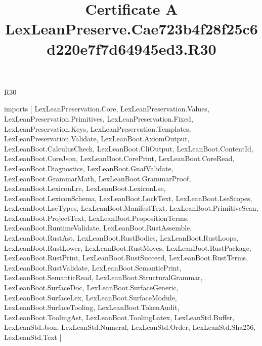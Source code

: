 \begin{lexlean}{R30}
\title{Certificate A LexLeanPreserve.Cae723b4f28f25c6d220e7f7d64945ed3.R30}
\begin{coremodule}
imports [
  LexLeanPreservation.Core,
  LexLeanPreservation.Values,
  LexLeanPreservation.Primitives,
  LexLeanPreservation.Fixed,
  LexLeanPreservation.Keys,
  LexLeanPreservation.Templates,
  LexLeanPreservation.Validate,
  LexLeanBoot.AxiomOutput,
  LexLeanBoot.CalculusCheck,
  LexLeanBoot.CliOutput,
  LexLeanBoot.ContentId,
  LexLeanBoot.CoreJson,
  LexLeanBoot.CorePrint,
  LexLeanBoot.CoreRead,
  LexLeanBoot.Diagnostics,
  LexLeanBoot.GnafValidate,
  LexLeanBoot.GrammarMath,
  LexLeanBoot.GrammarProof,
  LexLeanBoot.LexiconLre,
  LexLeanBoot.LexiconLse,
  LexLeanBoot.LexiconSchema,
  LexLeanBoot.LockText,
  LexLeanBoot.LseScopes,
  LexLeanBoot.LseTypes,
  LexLeanBoot.ManifestText,
  LexLeanBoot.PrimitiveScan,
  LexLeanBoot.ProjectText,
  LexLeanBoot.PropositionTerms,
  LexLeanBoot.RuntimeValidate,
  LexLeanBoot.RustAssemble,
  LexLeanBoot.RustAst,
  LexLeanBoot.RustBodies,
  LexLeanBoot.RustLoops,
  LexLeanBoot.RustLower,
  LexLeanBoot.RustMoves,
  LexLeanBoot.RustPackage,
  LexLeanBoot.RustPrint,
  LexLeanBoot.RustSucceed,
  LexLeanBoot.RustTerms,
  LexLeanBoot.RustValidate,
  LexLeanBoot.SemanticPrint,
  LexLeanBoot.SemanticRead,
  LexLeanBoot.StructuralGrammar,
  LexLeanBoot.SurfaceDoc,
  LexLeanBoot.SurfaceGeneric,
  LexLeanBoot.SurfaceLex,
  LexLeanBoot.SurfaceModule,
  LexLeanBoot.SurfaceTooling,
  LexLeanBoot.TokenAudit,
  LexLeanBoot.ToolingAst,
  LexLeanBoot.ToolingLatex,
  LexLeanStd.Buffer,
  LexLeanStd.Json,
  LexLeanStd.Numeral,
  LexLeanStd.Order,
  LexLeanStd.Sha256,
  LexLeanStd.Text
]


\end{coremodule}
\end{lexlean}
